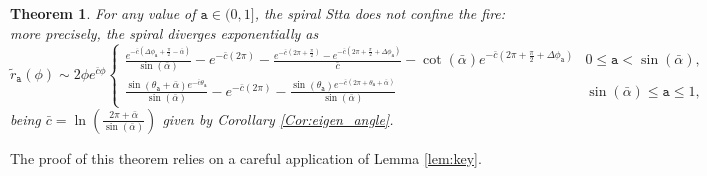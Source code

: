 \documentclass[reqno]{amsart}
\theoremstyle{definition} \newtheorem{definition}{Definition}[section]
\theoremstyle{definition} \newtheorem{remark}[definition]{Remark}
\theoremstyle{plain} \newtheorem{lemma}[definition]{Lemma}
\theoremstyle{plain} \newtheorem{proposition}[definition]{Proposition}
\theoremstyle{plain} \newtheorem{theorem}[definition]{Theorem}
\theoremstyle{plain} \newtheorem{corollary}[definition]{Corollary}
\theoremstyle{definition} \newtheorem{example}[definition]{Example}
\theoremstyle{plain} \newtheorem{claim}[clai]{Claim}
\theoremstyle{definition} \newtheorem{assumption}[definition]{Assumption}
\theoremstyle{definition} \newtheorem{observation}[definition]{Observation}
\newcommand{\1}{\mathbbm 1}
\numberwithin{equation}{section} %
\theoremstyle{plain} \newtheorem*{theorem*}{Theorem}
\theoremstyle{plain} \newtheorem{mthm}[maintheorem]{Main Theorem}
\theoremstyle{plain} \newtheorem*{mthm*}{Main Theorem}
\theoremstyle{plain} \newtheorem*{conjecture*}{Conjecture}
\theoremstyle{plain} \newtheorem{conjecture}[definition]{Conjecture}
\theoremstyle{plain} \newtheorem*{problem*}{Problem}
\begin{document}
\begin{theorem}
\label{thm:case:a}
For any value of $\mathtt a \in (0,1]$, the spiral  \gls{Stta} does not confine the fire: more precisely, the spiral diverges exponentially as
$$
\tilde r_\mathtt a(\phi) \sim 2 \phi e^{\bar c \phi} \begin{cases}
\frac{e^{-\bar c(\Delta \phi_{\mathtt a} + \frac{\pi}{2} - \bar \alpha)}}{\sin(\bar \alpha)} - e^{-\bar c(2\pi)} - \frac{e^{-\bar c(2\pi + \frac{\pi}{2})} - e^{- \bar c (2\pi + \frac{\pi}{2} + \Delta \phi_\mathtt a)}}{\bar c} - \cot(\bar \alpha) e^{-\bar c(2\pi + \frac{\pi}{2} + \Delta \phi_\mathtt a)} & 0 \leq \mathtt a < \sin(\bar \alpha), \\
\frac{\sin(\theta_\mathtt a + \bar \alpha) e^{-\bar c \theta_\mathtt a}}{\sin(\bar \alpha)} - e^{-\bar c(2\pi)} - \frac{\sin(\theta_\mathtt a) e^{-\bar c(2\pi + \theta_\mathtt a + \bar \alpha)}}{\sin(\bar \alpha)} & \sin(\bar \alpha) \leq \mathtt a \leq 1,
\end{cases} 
$$
being $\bar c = \ln(\frac{2\pi+\bar \alpha}{\sin(\bar \alpha)})$ given by Corollary \ref{Cor:eigen_angle}.
\end{theorem}

The proof of this theorem relies on a careful application of Lemma \ref{lem:key}.
\end{document}
